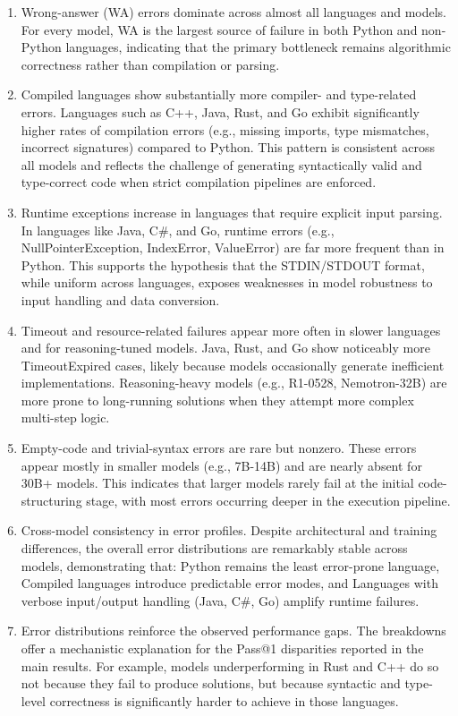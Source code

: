 \documentclass{llmxive}
\begin{document}
\begin{enumerate}
    \item Wrong-answer (WA) errors dominate across almost all languages and models. For every model, WA is the largest source of failure in both Python and non-Python languages, indicating that the primary bottleneck remains algorithmic correctness rather than compilation or parsing.
\item Compiled languages show substantially more compiler- and type-related errors. Languages such as C++, Java, Rust, and Go exhibit significantly higher rates of compilation errors (e.g., missing imports, type mismatches, incorrect signatures) compared to Python.
This pattern is consistent across all models and reflects the challenge of generating syntactically valid and type-correct code when strict compilation pipelines are enforced.
\item Runtime exceptions increase in languages that require explicit input parsing. In languages like Java, C\#, and Go, runtime errors (e.g., NullPointerException, IndexError, ValueError) are far more frequent than in Python. This supports the hypothesis that the STDIN/STDOUT format, while uniform across languages, exposes weaknesses in model robustness to input handling and data conversion.
\item Timeout and resource-related failures appear more often in slower languages and for reasoning-tuned models.
Java, Rust, and Go show noticeably more TimeoutExpired cases, likely because models occasionally generate inefficient implementations. Reasoning-heavy models (e.g., R1-0528, Nemotron-32B) are more prone to long-running solutions when they attempt more complex multi-step logic.
\item Empty-code and trivial-syntax errors are rare but nonzero. These errors appear mostly in smaller models (e.g., 7B-14B) and are nearly absent for 30B+ models.
This indicates that larger models rarely fail at the initial code-structuring stage, with most errors occurring deeper in the execution pipeline.
\item  Cross-model consistency in error profiles. Despite architectural and training differences, the overall error distributions are remarkably stable across models, demonstrating that: Python remains the least error-prone language, Compiled languages introduce predictable error modes, and Languages with verbose input/output handling (Java, C\#, Go) amplify runtime failures.

\item Error distributions reinforce the observed performance gaps. The breakdowns offer a mechanistic explanation for the Pass@1 disparities reported in the main results. For example, models underperforming in Rust and C++ do so not because they fail to produce solutions, but because syntactic and type-level correctness is significantly harder to achieve in those languages.
\end{enumerate} 
\end{document}

